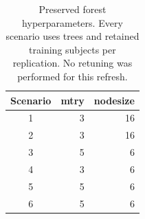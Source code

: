 \begin{table}[htbp]
\centering
\begin{tabular}{crr}
\toprule
Scenario & mtry & nodesize \\
\midrule
1 & 3 & 16 \\
2 & 3 & 16 \\
3 & 5 & 6 \\
4 & 3 & 6 \\
5 & 5 & 6 \\
6 & 5 & 6 \\
\bottomrule
\end{tabular}
\caption{Preserved forest hyperparameters. Every scenario uses \SimTrees{} trees and \SimTrainN{} retained training subjects per replication. No retuning was performed for this refresh.}
\label{tab:hyperparameters}
\end{table}
